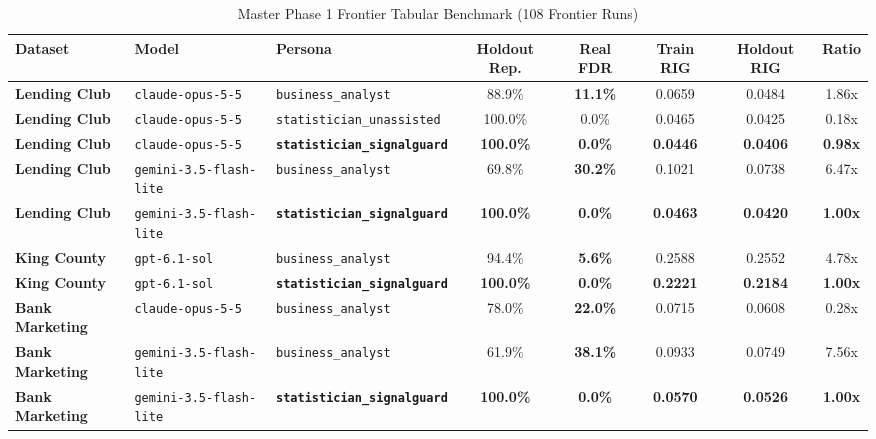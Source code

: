 \documentclass[11pt,a4paper]{article}
\begin{document}
\begin{table}[h!]
\centering
\small
\caption{Master Phase 1 Frontier Tabular Benchmark (108 Frontier Runs)}
\vspace{0.2cm}
\begin{tabular}{lllccccc}
\toprule
\textbf{Dataset} & \textbf{Model} & \textbf{Persona} & \textbf{Holdout Rep.} & \textbf{Real FDR} & \textbf{Train RIG} & \textbf{Holdout RIG} & \textbf{Ratio} \\
\midrule
\textbf{Lending Club} & \texttt{claude-opus-5-5} & \texttt{business\_analyst} & 88.9\% & \textbf{11.1\%} & 0.0659 & 0.0484 & 1.86x \\
\textbf{Lending Club} & \texttt{claude-opus-5-5} & \texttt{statistician\_unassisted} & 100.0\% & 0.0\% & 0.0465 & 0.0425 & 0.18x \\
\textbf{Lending Club} & \texttt{claude-opus-5-5} & \textbf{\texttt{statistician\_signalguard}} & \textbf{100.0\%} & \textbf{0.0\%} & \textbf{0.0446} & \textbf{0.0406} & \textbf{0.98x} \\
\midrule
\textbf{Lending Club} & \texttt{gemini-3.5-flash-lite} & \texttt{business\_analyst} & 69.8\% & \textbf{30.2\%} & 0.1021 & 0.0738 & 6.47x \\
\textbf{Lending Club} & \texttt{gemini-3.5-flash-lite} & \textbf{\texttt{statistician\_signalguard}} & \textbf{100.0\%} & \textbf{0.0\%} & \textbf{0.0463} & \textbf{0.0420} & \textbf{1.00x} \\
\midrule
\textbf{King County} & \texttt{gpt-6.1-sol} & \texttt{business\_analyst} & 94.4\% & \textbf{5.6\%} & 0.2588 & 0.2552 & 4.78x \\
\textbf{King County} & \texttt{gpt-6.1-sol} & \textbf{\texttt{statistician\_signalguard}} & \textbf{100.0\%} & \textbf{0.0\%} & \textbf{0.2221} & \textbf{0.2184} & \textbf{1.00x} \\
\midrule
\textbf{Bank Marketing} & \texttt{claude-opus-5-5} & \texttt{business\_analyst} & 78.0\% & \textbf{22.0\%} & 0.0715 & 0.0608 & 0.28x \\
\textbf{Bank Marketing} & \texttt{gemini-3.5-flash-lite} & \texttt{business\_analyst} & 61.9\% & \textbf{38.1\%} & 0.0933 & 0.0749 & 7.56x \\
\textbf{Bank Marketing} & \texttt{gemini-3.5-flash-lite} & \textbf{\texttt{statistician\_signalguard}} & \textbf{100.0\%} & \textbf{0.0\%} & \textbf{0.0570} & \textbf{0.0526} & \textbf{1.00x} \\
\bottomrule
\end{tabular}
\end{table}
\end{document}
